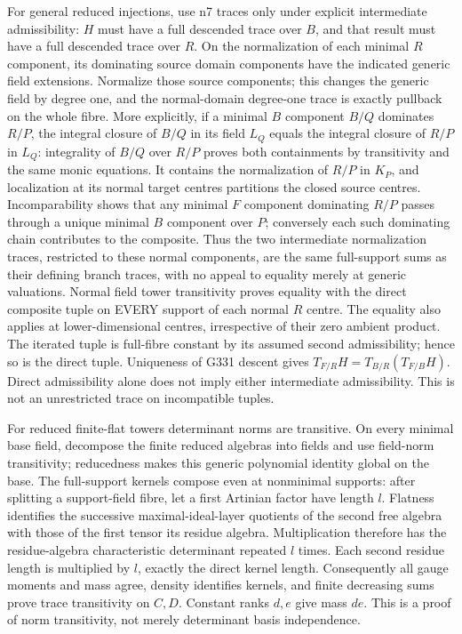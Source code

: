 For general reduced injections, use n7 traces only under explicit intermediate admissibility: $H$ must have a full descended trace over $B$, and that result must have a full descended trace over $R$. On the normalization of each minimal $R$ component, its dominating source domain components have the indicated generic field extensions. Normalize those source components; this changes the generic field by degree one, and the normal-domain degree-one trace is exactly pullback on the whole fibre. More explicitly, if a minimal $B$ component $B/Q$ dominates $R/P$, the integral closure of $B/Q$ in its field $L_Q$ equals the integral closure of $R/P$ in $L_Q$: integrality of $B/Q$ over $R/P$ proves both containments by transitivity and the same monic equations. It contains the normalization of $R/P$ in $K_P$, and localization at its normal target centres partitions the closed source centres. Incomparability shows that any minimal $F$ component dominating $R/P$ passes through a unique minimal $B$ component over $P$; conversely each such dominating chain contributes to the composite. Thus the two intermediate normalization traces, restricted to these normal components, are the same full-support sums as their defining branch traces, with no appeal to equality merely at generic valuations. Normal field tower transitivity proves equality with the direct composite tuple on EVERY support of each normal $R$ centre. The equality also applies at lower-dimensional centres, irrespective of their zero ambient product. The iterated tuple is full-fibre constant by its assumed second admissibility; hence so is the direct tuple. Uniqueness of G331 descent gives $T_{F/R}H=T_{B/R}(T_{F/B}H)$. Direct admissibility alone does not imply either intermediate admissibility. This is not an unrestricted trace on incompatible tuples.

For reduced finite-flat towers determinant norms are transitive. On every minimal base field, decompose the finite reduced algebras into fields and use field-norm transitivity; reducedness makes this generic polynomial identity global on the base. The full-support kernels compose even at nonminimal supports: after splitting a support-field fibre, let a first Artinian factor have length $l$. Flatness identifies the successive maximal-ideal-layer quotients of the second free algebra with those of the first tensor its residue algebra. Multiplication therefore has the residue-algebra characteristic determinant repeated $l$ times. Each second residue length is multiplied by $l$, exactly the direct kernel length. Consequently all gauge moments and mass agree, density identifies kernels, and finite decreasing sums prove trace transitivity on $C,D$. Constant ranks $d,e$ give mass $de$. This is a proof of norm transitivity, not merely determinant basis independence.

